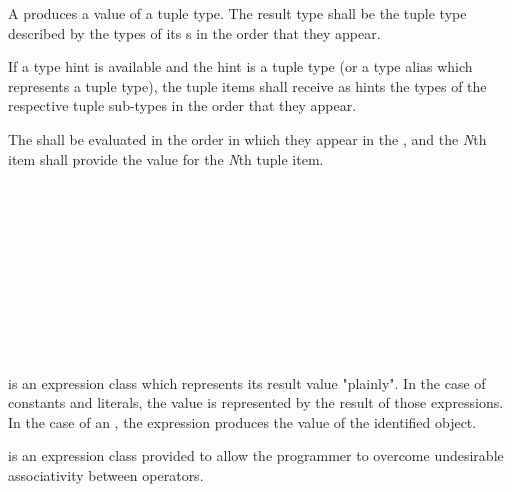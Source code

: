 \specsubsubitem
A  produces a value of a tuple type. The result type
shall be the tuple type described by the types of its s
in the order that they appear.

\specsubsubitem
If a type hint is available and the hint is a tuple type (or a type alias which
represents a tuple type), the tuple items shall receive as hints the types of
the respective tuple sub-types in the order that they appear.

\specsubsubitem
The  shall be evaluated in the order in which they
appear in the , and the \textit{N}th item shall
provide the value for the \textit{N}th tuple item.


\begin{grammar}
 \\
	 \\
	 \\
	 \\
	 \\
	 \\

 \\
	 \\
	\terminal{(}  \terminal{)} \\
\end{grammar}

\specsubsubitem
{} is an expression class which represents its
result value "plainly". In the case of constants and literals, the value is
represented by the result of those expressions. In the case of an
, the expression produces the value of the identified
object.

\specsubsubitem
{} is an expression class provided to allow the
programmer to overcome undesirable associativity between operators.


\begin{grammar}
 \\
	 \terminal{(}  \terminal{)} \\
	 \terminal{(}   \terminal{)} \\
	 \terminal{(}  \terminal{,}  \terminal{)} \\
	 \terminal{(}  \terminal{)} \\
\end{grammar}


